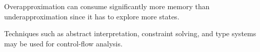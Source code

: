 \documentclass{kththesis}
\begin{document}
Overapproximation can consume significantly more memory than underapproximation since it has to explore more states\cite{alternating}.

Techniques such as abstract interpretation, constraint solving, and type systems may be used for control-flow analysis.








\end{document}
